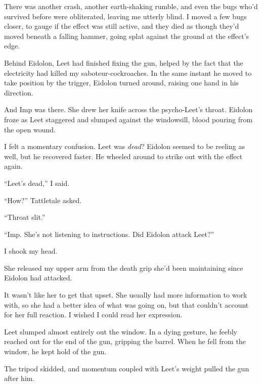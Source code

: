 There was another crash, another earth-shaking rumble, and even the bugs who'd survived before were obliterated, leaving me utterly blind.  I moved a few bugs closer, to gauge if the effect was still active, and they died as though they'd moved beneath a falling hammer, going splat against the ground at the effect's edge.



Behind Eidolon, Leet had finished fixing the gun, helped by the fact that the electricity had killed my saboteur-cockroaches.  In the same instant he moved to take position by the trigger, Eidolon turned around, raising one hand in his direction.



And Imp was there.  She drew her knife across the psycho-Leet's throat.  Eidolon froze as Leet staggered and slumped against the windowsill, blood pouring from the open wound.



I felt a momentary confusion.  Leet was \emph{dead}?  Eidolon seemed to be reeling as well, but he recovered faster.  He wheeled around to strike out with the effect again.



``Leet's dead,'' I said.



``How?'' Tattletale asked.



``Throat slit.''



``Imp.  She's not listening to instructions.  Did Eidolon attack Leet?''



I shook my head.



She released my upper arm from the death grip she'd been maintaining since Eidolon had attacked.



It wasn't like her to get that upset.  She usually had more information to work with, so she had a better idea of what was going on, but that couldn't account for her full reaction.  I wished I could read her expression.



Leet slumped almost entirely out the window.  In a dying gesture, he feebly reached out for the end of the gun, gripping the barrel.  When he fell from the window, he kept hold of the gun.



The tripod skidded, and momentum coupled with Leet's weight pulled the gun after him.



